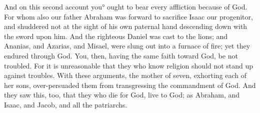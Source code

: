 {And on this second account you° ought to bear every affliction because of God.
For whom also our father Abraham was forward to sacrifice Isaac our progenitor, and shuddered not at the sight of his own paternal hand descending down with the sword upon him.
And the righteous Daniel was cast to the lions; and Ananias, and Azarias, and Misael, were slung out into a furnace of fire; yet they endured through God.
You, then, having the same faith toward God, be not troubled.
For it is unreasonable that they who know religion should not stand up against troubles.
With these arguments, the mother of seven, exhorting each of her sons, over-persuaded them from transgressing the commandment of God.
And they saw this, too, that they who die for God, live to God; as Abraham, and Isaac, and Jacob, and all the patriarchs.

}
